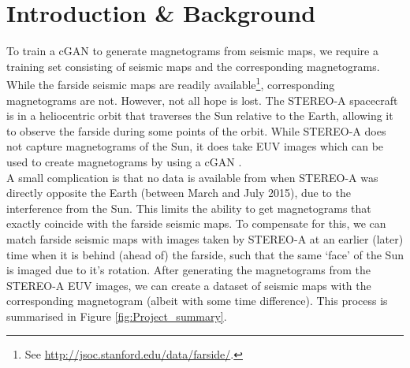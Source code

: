 \documentclass[11pt,a4paper,onecolumn]{report}
\begin{document}
%
%
%
%
\chapter{Introduction \& Background}
%
%
%
%



%
%

To train a cGAN to generate magnetograms from seismic maps, we require a
training set consisting of seismic maps and the corresponding magnetograms.
While the farside seismic maps are readily available\footnote{See
  \url{http://jsoc.stanford.edu/data/farside/}.}, corresponding magnetograms are
not. However, not all hope is lost. The STEREO-A spacecraft is in a heliocentric
orbit that traverses the Sun relative to the Earth, allowing it to observe the
farside during some points of the orbit. While STEREO-A does not capture
magnetograms of the Sun, it does take EUV images which can be used to create
magnetograms by using a cGAN \citep{Kim2019}.\\

A small complication is that no data is available from when STEREO-A was
directly opposite the Earth (between March and July 2015), due to the
interference from the Sun. This limits the ability to get magnetograms that
exactly coincide with the farside seismic maps. To compensate for this, we can
match farside seismic maps with images taken by STEREO-A at an earlier (later)
time when it is behind (ahead of) the farside, such that the same `face' of the
Sun is imaged due to it's rotation. After generating the magnetograms from the
STEREO-A EUV images, we can create a dataset of seismic maps with the
corresponding magnetogram (albeit with some time difference). This process is
summarised in Figure \ref{fig:Project_summary}.\\
\end{document}
